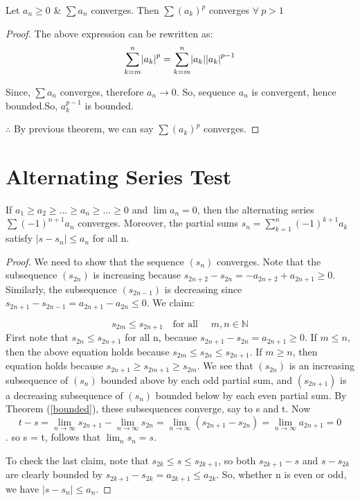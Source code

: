 \documentclass{notes}
\begin{document}
\begin{corollary}{}
	Let $ a_n \geq 0$ \& $\sum a_n$ converges. 
	Then
	$ \sum (a_k) ^ p$ converges $\forall\ p>1$ 
\end{corollary}
\begin{proof}The above expression can be rewritten as:
	$$  \sum_{k=m}^{n} \abs{a_k}^p = \sum_{k=m}^{n} \abs{a_k}\abs{a_k}^{p-1}$$
	
	Since,  $\sum a_n$ converges, therefore $a_n \to 0$. So, sequence $a_n$ is convergent, hence bounded.So, $a_k ^{p-1}$ is bounded.
	
	$\therefore$ By previous theorem, we can say
	$ \sum (a_k) ^ p$ converges.
\end{proof}
\section{Alternating Series Test}
\begin{theorem}{}
	If $a_1 \geq a_2 \geq \ldots \geq a_n \geq \ldots \geq 0$ and $\lim a_n = 0$, then the alternating series $\sum (- 1)^{n+1}a_n$ converges. Moreover, the partial sums $s_n =\sum_{k = 1}^{n} ( - 1)^{k+1}a_k$ satisfy $|s - s_n|\leq a_n$ for all n.
\end{theorem}
\begin{proof}
	We need to show that the sequence $(s_n)$ converges. Note that the
	subsequence $(s_{2n})$ is increasing because $s_{2n+2} - s_{2n} =  - a_{2n+2} +
	a_{2n+1}\geq  0$. Similarly, the subsequence $(s_{2n - 1})$ is decreasing since
	$s_{2n+1} - s_{2n - 1} = a_{2n+1} - a_{2n}\leq 0$. We claim:
	
	$$      s_{2m} \leq s_{2n+1}\quad \text{for all }\quad m,n \in \mathbb{N}           $$
	First note that $s_{2n} \leq s_{2n+1}$ for all n, because $s_{2n+1} - s_{2n} = a_{2n+1} \geq 0$.
	If $m\leq  n$, then the above equation holds because $s_{2m} \leq s_{2n} \leq s_{2n+1}$. If $m \geq n$,
	then equation  holds because $s_{2n+1}\geq s_{2m+1 }\geq  s_{2m}$.  We
	see that $(s_{2n}) $ is an increasing subsequence of $(s_n)$ bounded above
	by each odd partial sum, and $(s_{2n+1})$ is a decreasing subsequence
	of $(s_n)$ bounded below by each even partial sum. By Theorem (\ref{bounded}),
	these subsequences converge, say to s and t. Now 
	$$ t - s = \lim_{n \to \infty} s_{2n+1} - \lim_{n \to \infty}s_{2n} = \lim\limits_{n \to \infty}(s_{2n+1} - s_{2n}) = \lim\limits_{n \to \infty}a_{2n+1} = 0$$
	. so s = t, follows that $\lim_{n}s_n = s$.
	
	To check the last claim, note that $s_{2k} \leq s \leq s_{2k+1}$, so both
	$s_{2k+1} - s$ and $s - s_{2k}$ are clearly bounded by $s_{2k+1} - s_{2k} = a_{2k+1} \leq a_{2k}$.
	So, whether n is even or odd, we have $|s - s_n| \leq a_n$.
\end{proof}
\end{document}
